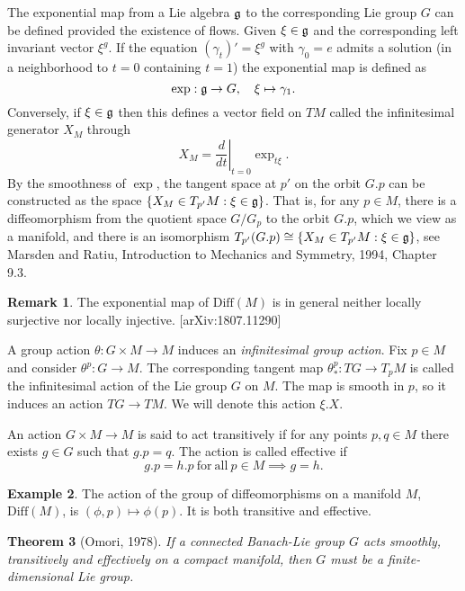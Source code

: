 \documentclass{article}
\theoremstyle{plain}
\newtheorem{teo}{Theorem}[section]
\theoremstyle{definition}
\newtheorem{oss}[teo]{Remark}
\newtheorem{exam}[teo]{Example}
\newcommand{\Diff}{\ensuremath{\mathrm{Diff}}}
\newcommand{\mf}{\ensuremath{\mathfrak}}
\begin{document}
The exponential map from a Lie algebra $\mf g$ to the corresponding Lie group $G$ can be defined provided the existence of flows. Given $\xi\in\mf g$ and the corresponding left invariant vector $\xi^g$. If the equation $(\gamma_t)'=\xi^g$ with $\gamma_0=e$ admits a solution (in a neighborhood to $t=0$ containing $t=1$) the exponential map is defined as
\[
\exp: \mf g\to G,\quad \xi \mapsto \gamma_1.
\]
Conversely, if $\xi\in \mf g$ then this defines a vector field on $TM$ called the infinitesimal generator $X_M$ through
\[
X_M=\left.\frac{d}{dt}\right|_{t=0}\exp_{t\xi}.
\]
By the smoothness of $\exp$, the tangent space at $p'$ on the orbit $G.p$ can be constructed as the space $\{X_M\in T_{p'}M : \xi\in\mf g\}$. That is, for any $p\in M$, there is a diffeomorphism from the quotient space $G/G_{p}$ to the orbit $G.p$, which we view as a manifold, and there is an isomorphism $T_{p'}(G.p)\cong\{X_M\in T_{p'}M : \xi\in\mf g\}$, see Marsden and Ratiu, Introduction to Mechanics and Symmetry, 1994, Chapter 9.3.

\begin{oss}
	The exponential map of $\Diff(M)$ is in general neither locally surjective nor locally injective. [arXiv:1807.11290]
\end{oss}

A group action $\theta:G\times M\to M$ induces an \textit{infinitesimal group action}. Fix $p\in M$ and consider $\theta^p:G\to M$. The corresponding tangent map $\theta^p_*:TG\to T_pM$ is called the infinitesimal action of the Lie group $G$ on $M$. The map is smooth in $p$, so it induces an action $TG\to TM$. We will denote this action $\xi.X$. 

An action $G\times M\to M$ is said to act transitively if for any points $p,q\in M$ there exists $g\in G$ such that $g.p=q$. The action is called effective if
\[
g.p=h.p\ \mathrm{for}\ \mathrm{all}\ p\in M \implies g=h.
\]

\begin{exam}
	The action of the group of diffeomorphisms on a manifold $M$, $\Diff(M)$, is $(\phi,p)\mapsto \phi(p)$. It is both transitive and effective.
\end{exam}

\begin{teo}[Omori, 1978]
	If a connected Banach-Lie group $G$ acts smoothly, transitively and effectively on a compact manifold, then $G$ must be a finite-dimensional Lie group.
\end{teo}
\end{document}

